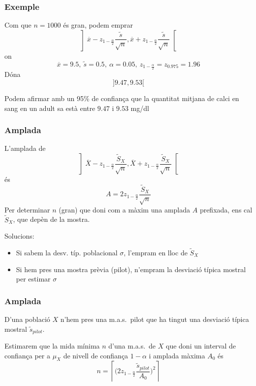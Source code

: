 \documentclass[12pt,t]{beamer}
\renewcommand{\emph}[1]{{\color{red}#1}}
\theoremstyle{plain}
\theoremstyle{definition}
\begin{document}
\begin{frame}
\frametitle{Exemple}
\vspace*{-2ex}

Com que $n=1000$ és gran, podem emprar
$$
\left]\overline{x}-z_{1-\frac{\alpha}{2}}\frac{\widetilde{s}}{\sqrt{n}},
    \overline{x}+z_{1-\frac{\alpha}{2}}\frac{\widetilde{s}}{\sqrt{n}}\right[
$$
on
$$
\overline{x}=9.5,\ \widetilde{s}=0.5,\
\alpha=0.05,\  z_{1-\frac{\alpha}{2}}=z_{0.975}=1.96
$$
Dóna
$$
]9.47, 9.53[
$$

Podem afirmar amb un 95\% de confiança que la quantitat mitjana de calci en sang en un adult sa està entre  $9.47$  i  $9.53$ mg/dl


\end{frame}



\begin{frame}
\frametitle{Amplada}
\vspace*{-2ex}

L'amplada de 
$$
\left]\overline{X}-z_{1-\frac{\alpha}{2}}\frac{\widetilde{S}_X}{\sqrt{n}},
    \overline{X}+z_{1-\frac{\alpha}{2}}\frac{\widetilde{S}_X}{\sqrt{n}}\right[
$$
és 
$$
A=2z_{1-\frac{\alpha}{2}}\frac{\widetilde{S}_X}{\sqrt{n}}
$$
Per determinar $n$ (gran) que doni com a màxim una amplada $A$ prefixada, ens cal $\widetilde{S}_X$, que depèn de la mostra.
\medskip

 Solucions:
\begin{itemize}
\item Si sabem la desv. típ. poblacional $\sigma$, l'empram en lloc de $\widetilde{S}_X$

\item Si hem pres una mostra prèvia (\emph{pilot}), n'empram la desviació típica mostral per estimar $\sigma$

\end{itemize}



\end{frame}



\begin{frame}
\frametitle{Amplada}

\begin{block}{}
D'una població $X$ n'hem pres una  \emph{m.a.s.\ pilot} que ha tingut una desviació típica mostral $\widetilde{s}_{pilot}$.
\medskip

Estimarem que la mida mínima $n$ d'una m.a.s.\ de $X$ que doni un interval de confiança per a $\mu_X$ de nivell de confiança $1-\alpha$ i amplada màxima $A_0$ és
$$
n=\left\lceil \Big(2z_{1-\frac{\alpha}{2}}\frac{\widetilde{s}_{pilot}}{A_0}\Big)^2\right\rceil
$$
\end{block}



\end{frame}
\end{document}
